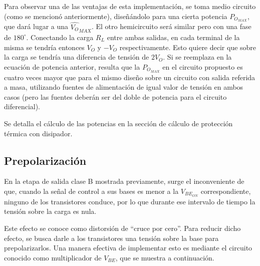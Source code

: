Para observar una de las ventajas de esta implementación, se toma medio circuito (como se mencionó anteriormente), diseñándolo para una cierta potencia $P_{O_{MAX}}$, que dará lugar a una $\hat{V_O}_{MAX}$. El otro hemicircuito será similar pero con una fase de $180^{\circ}$. Conectando la carga $R_L$ entre ambas salidas, en cada terminal de la misma se tendría entonces $V_O$ y $-V_O$ respectivamente. Esto quiere decir que sobre la carga se tendría una diferencia de tensión de $2V_O$. Si se reemplaza en la ecuación de potencia anterior, resulta que la $P_{O_{MAX}}$ en el circuito propuesto es cuatro veces mayor que para el mismo diseño sobre un circuito con salida referida a masa, utilizando fuentes de alimentación de igual valor de tensión en ambos casos (pero las fuentes deberán ser del doble de potencia para el circuito diferencial).\par
Se detalla el cálculo de las potencias en la sección de cálculo de protección térmica con disipador.

\subsection{Prepolarización}

En la etapa de salida clase B mostrada previamente, surge el inconveniente de que, cuando la señal de control a sus bases es menor a la $V_{BE_{ON}}$ correspondiente, ninguno de los transistores conduce, por lo que durante ese intervalo de tiempo la tensión sobre la carga es nula.\par
Este efecto se conoce como distorsión de ``cruce por cero''. Para reducir dicho efecto, se busca darle a los transistores una tensión sobre la base para prepolarizarlos. Una manera efectiva de implementar esto es mediante el circuito conocido como multiplicador de $V_{BE}$, que se muestra a continuación.

